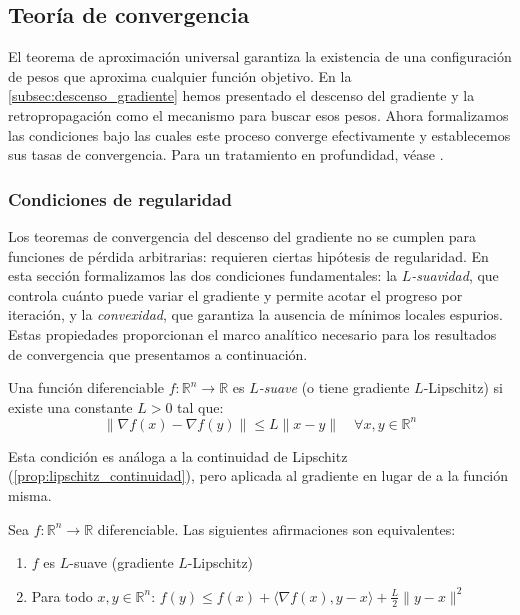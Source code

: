 \subsection{Teoría de convergencia}\label{subsec:teoria_convergencia}

El teorema de aproximación universal garantiza la existencia de una configuración de pesos que aproxima cualquier función objetivo. En la \autoref{subsec:descenso_gradiente} hemos presentado el descenso del gradiente y la retropropagación como el mecanismo para buscar esos pesos. Ahora formalizamos las condiciones bajo las cuales este proceso converge efectivamente y establecemos sus tasas de convergencia. Para un tratamiento en profundidad, véase \citet{bottou2018optimization}.

\subsubsection{Condiciones de regularidad}

Los teoremas de convergencia del descenso del gradiente no se cumplen para funciones de pérdida arbitrarias: requieren ciertas hipótesis de regularidad. En esta sección formalizamos las dos condiciones fundamentales: la \textit{$L$-suavidad}, que controla cuánto puede variar el gradiente y permite acotar el progreso por iteración, y la \textit{convexidad}, que garantiza la ausencia de mínimos locales espurios. Estas propiedades proporcionan el marco analítico necesario para los resultados de convergencia que presentamos a continuación.

\begin{definition}\label{def:L_smooth}
	Una función diferenciable \(f: \mathbb{R}^n \to \mathbb{R}\) es \textit{\(L\)-suave} (o tiene gradiente \(L\)-Lipschitz) si existe una constante \(L > 0\) tal que:
	\[
		\|\nabla f(x) - \nabla f(y)\| \leq L\|x - y\| \quad \forall x, y \in \mathbb{R}^n
	\]
\end{definition}

Esta condición es análoga a la continuidad de Lipschitz (\autoref{prop:lipschitz_continuidad}), pero aplicada al gradiente en lugar de a la función misma.

\begin{proposition}\label{prop:L_smooth_equiv}
	Sea \(f: \mathbb{R}^n \to \mathbb{R}\) diferenciable. Las siguientes afirmaciones son equivalentes:
	\begin{enumerate}
		\item \(f\) es \(L\)-suave (gradiente \(L\)-Lipschitz)
		\item Para todo \(x, y \in \mathbb{R}^n\): \(f(y) \leq f(x) + \langle \nabla f(x), y - x \rangle + \frac{L}{2}\|y - x\|^2\)
	\end{enumerate}
\end{proposition}


